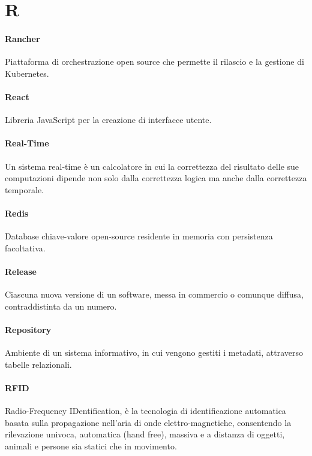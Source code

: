 \documentclass[]{article}
\begin{document}
	\newpage

	\section*{R}

	\paragraph*{Rancher}
	Piattaforma di orchestrazione open source che permette il rilascio e la gestione di Kubernetes.

	\paragraph*{React}
	Libreria JavaScript per la creazione di interfacce utente.

	\paragraph*{Real-Time}
	Un sistema real-time è un calcolatore in cui la correttezza del risultato delle sue computazioni dipende non solo dalla correttezza logica ma anche dalla correttezza temporale.

    \paragraph*{Redis}
    Database chiave-valore open-source residente in memoria con persistenza facoltativa.

	\paragraph*{Release}
	Ciascuna nuova versione di un software, messa in commercio o comunque diffusa, contraddistinta da un numero.

	\paragraph*{Repository}
	Ambiente di un sistema informativo, in cui vengono gestiti i metadati, attraverso tabelle relazionali.

	\paragraph*{RFID}
	Radio-Frequency IDentification, è la tecnologia di identificazione automatica basata sulla propagazione nell'aria di onde elettro-magnetiche, consentendo la rilevazione univoca, automatica (hand free), massiva e a distanza di oggetti, animali e persone sia statici che in movimento.
\end{document}
